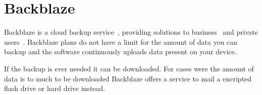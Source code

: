 \section{Backblaze}

Backblaze is a cloud backup service~\cite{www-hid-sp18-601-bblaze-about}, 
providing solutions to business~\cite{www-hid-sp18-601-bblaze-business} and 
private users~\cite{www-hid-sp18-601-bblaze-personal}. Backblaze plans do not
have a limit for the amount of data you can backup and the software continuously 
uploads data present on your device. 

If the backup is ever needed it can be downloaded. For cases were the amount of 
data is to much to be downloaded Backblaze offers a service to mail a encripted 
flash drive or hard drive instead.